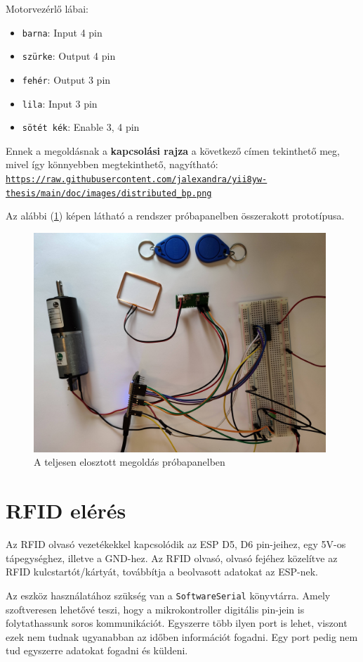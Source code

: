 \documentclass[
]{thesis-ekf}
\theoremstyle{definition}
\theoremstyle{remark}
\begin{document}
Motorvezérlő lábai:
\begin{itemize}
    \item \verb|barna|: Input 4 pin
    \item \verb|szürke|: Output 4 pin
    \item \verb|fehér|: Output 3 pin
    \item \verb|lila|: Input 3 pin
    \item \verb|sötét kék|: Enable 3, 4 pin
\end{itemize}

Ennek a megoldásnak a \textbf{kapcsolási rajza} a következő címen tekinthető meg, mivel így könnyebben megtekinthető, nagyítható:
\\\texttt{\url{https://raw.githubusercontent.com/jalexandra/yii8yw-thesis/main/doc/images/distributed_bp.png}}

Az alábbi (\ref{fig:elosztott}) képen látható a rendszer próbapanelben összerakott prototípusa.

\begin{figure}[ht]
\centering
\includegraphics[width=11cm, angle=270, origin=c]{elosztott.jpg}
\caption{A teljesen elosztott megoldás próbapanelben}
\label{fig:elosztott}
\end{figure}

\section{RFID elérés}
Az RFID olvasó vezetékekkel kapcsolódik az ESP D5, D6 pin-jeihez, egy 5V-os tápegységhez, illetve a GND-hez. Az RFID olvasó, olvasó fejéhez közelítve az RFID kulcstartót/kártyát, továbbítja a beolvasott adatokat az ESP-nek.

Az eszköz használatához szükség van a \texttt{SoftwareSerial} könyvtárra. Amely szoftveresen lehetővé teszi, hogy a mikrokontroller digitális pin-jein is folytathassunk soros kommunikációt. Egyszerre több ilyen port is lehet, viszont ezek nem tudnak ugyanabban az időben információt fogadni. Egy port pedig nem tud egyszerre adatokat fogadni és küldeni. \cite{software-serial-lib}
\end{document}
